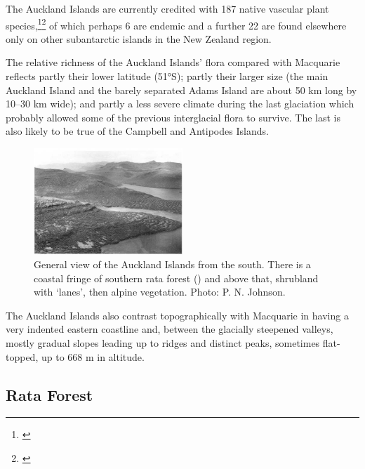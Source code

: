 The Auckland Islands are currently credited with 187 native vascular plant species,\footnote{\cite{meurk1982supplementary}}\footnote{\cite{johnson1975vascular}} of which perhaps 6 are endemic and a further 22 are found elsewhere only on other subantarctic islands in the New Zealand region.

The relative richness of the Auckland Islands' flora compared with Macquarie reflects partly their lower latitude (51°S); partly their larger size (the main Auckland Island and the barely separated Adams Island are about 50 km long by 10--30 km wide); and partly a less severe climate during the last glaciation which probably allowed some of the previous interglacial flora to survive.
The last is also likely to be true of the Campbell and Antipodes Islands.

\begin{figure}
	\includegraphics[width=0.5\textwidth]{graphics/figure116auckland-islands.jpg}
	\centering
	\caption[General view of the Auckland Islands from the south]{General view of the Auckland Islands from the south.
	There is a coastal fringe of southern rata forest () and above that, shrubland with `lanes', then alpine vegetation.
	Photo: P. N. Johnson.}%
	\label{fig:116auckland-islands}
\end{figure}

The Auckland Islands also contrast topographically with Macquarie in having a very indented eastern coastline and, between the glacially steepened valleys, mostly gradual slopes leading up to ridges and distinct peaks, sometimes flat-topped, up to 668 m in altitude.

\subsection{Rata Forest}

